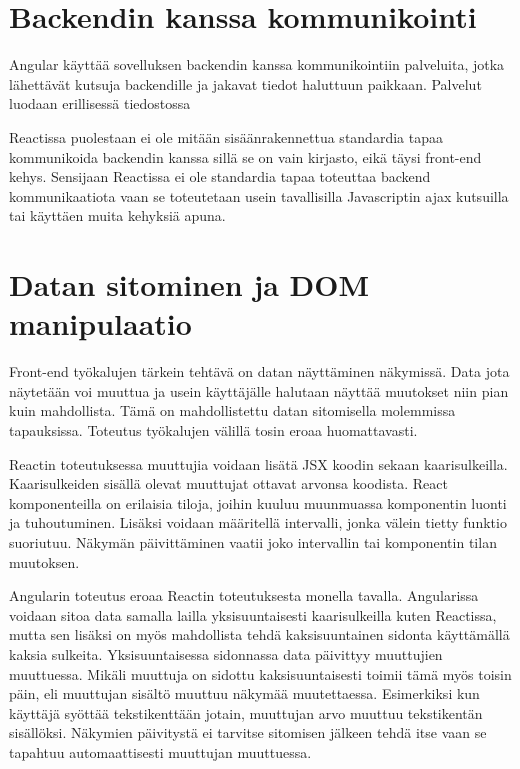 \documentclass[a4paper,12pt,twoside]{article} %
\begin{document}
\vspace{4mm}\noindent

\newpage


\section{Backendin kanssa kommunikointi}

Angular käyttää sovelluksen backendin kanssa kommunikointiin palveluita, jotka lähettävät kutsuja backendille ja jakavat tiedot haluttuun paikkaan. Palvelut luodaan erillisessä tiedostossa

\vspace{4mm}\noindent Reactissa puolestaan ei ole mitään sisäänrakennettua standardia tapaa kommunikoida backendin kanssa sillä se on vain kirjasto, eikä täysi front-end kehys. Sensijaan Reactissa ei ole standardia tapaa toteuttaa backend kommunikaatiota vaan se toteutetaan usein tavallisilla Javascriptin ajax kutsuilla tai käyttäen muita kehyksiä apuna.

\newpage

\section{Datan sitominen ja DOM manipulaatio}

Front-end työkalujen tärkein tehtävä on datan näyttäminen näkymissä. Data jota näytetään voi muuttua ja usein käyttäjälle halutaan näyttää muutokset niin pian kuin mahdollista. Tämä on mahdollistettu datan sitomisella molemmissa tapauksissa. Toteutus työkalujen välillä tosin eroaa huomattavasti.

\vspace{4mm}\noindent Reactin toteutuksessa muuttujia voidaan lisätä JSX koodin sekaan kaarisulkeilla. Kaarisulkeiden sisällä olevat muuttujat ottavat arvonsa koodista. React komponenteilla on erilaisia tiloja, joihin kuuluu muunmuassa komponentin luonti ja tuhoutuminen. Lisäksi voidaan määritellä intervalli, jonka välein tietty funktio suoriutuu. Näkymän päivittäminen vaatii joko intervallin tai komponentin tilan muutoksen.

\vspace{4mm}\noindent
Angularin toteutus eroaa Reactin toteutuksesta monella tavalla. Angularissa voidaan sitoa data samalla lailla yksisuuntaisesti kaarisulkeilla kuten Reactissa, mutta sen lisäksi on myös mahdollista tehdä kaksisuuntainen sidonta käyttämällä kaksia sulkeita. Yksisuuntaisessa sidonnassa data päivittyy muuttujien muuttuessa. Mikäli muuttuja on sidottu kaksisuuntaisesti toimii tämä myös toisin päin, eli muuttujan sisältö muuttuu näkymää muutettaessa. Esimerkiksi kun käyttäjä syöttää tekstikenttään jotain, muuttujan arvo muuttuu tekstikentän sisällöksi. Näkymien päivitystä ei tarvitse sitomisen jälkeen tehdä itse vaan se tapahtuu automaattisesti muuttujan muuttuessa.
\end{document}
